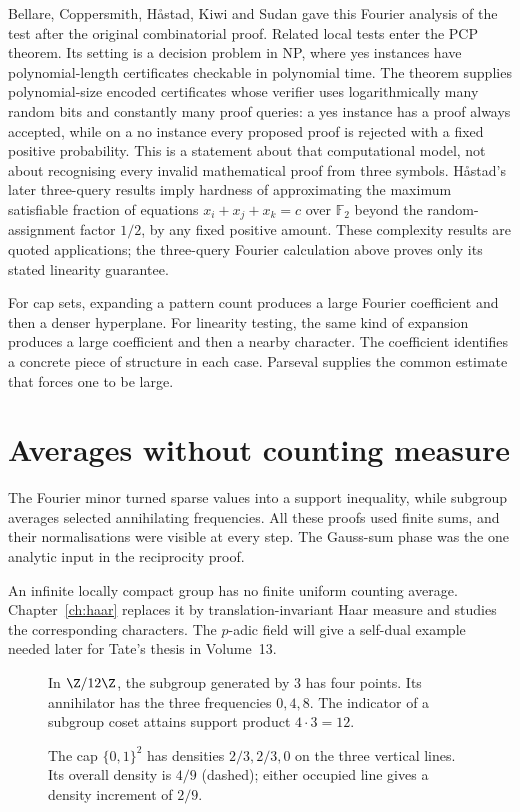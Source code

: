 Bellare, Coppersmith, H\aa stad, Kiwi and Sudan gave this Fourier analysis of the test after the original combinatorial proof. Related local tests enter the PCP theorem. Its setting is a decision problem in NP, where yes instances have polynomial-length certificates checkable in polynomial time. The theorem supplies polynomial-size encoded certificates whose verifier uses logarithmically many random bits and constantly many proof queries: a yes instance has a proof always accepted, while on a no instance every proposed proof is rejected with a fixed positive probability. This is a statement about that computational model, not about recognising every invalid mathematical proof from three symbols.
H\aa stad's later three-query results imply hardness of approximating the maximum satisfiable fraction of equations $x_i+x_j+x_k=c$ over $\mathbb F_2$ beyond the random-assignment factor $1/2$, by any fixed positive amount. These complexity results are quoted applications; the three-query Fourier calculation above proves only its stated linearity guarantee.

\begin{beauty}
For cap sets, expanding a pattern count produces a large Fourier coefficient and then a denser hyperplane. For linearity testing, the same kind of expansion produces a large coefficient and then a nearby character. The coefficient identifies a concrete piece of structure in each case. Parseval supplies the common estimate that forces one to be large.
\end{beauty}

\section{Averages without counting measure}

The Fourier minor turned sparse values into a support inequality, while subgroup averages selected annihilating frequencies. All these proofs used finite sums, and their normalisations were visible at every step. The Gauss-sum phase was the one analytic input in the reciprocity proof.

An infinite locally compact group has no finite uniform counting average. Chapter~\ref{ch:haar} replaces it by translation-invariant Haar measure and studies the corresponding characters. The $p$-adic field will give a self-dual example needed later for Tate's thesis in Volume~13.

\begin{figure}[ht]
\centering{}
\caption{In $\Z/12\Z$, the subgroup generated by $3$ has four points. Its annihilator has the three frequencies $0,4,8$. The indicator of a subgroup coset attains support product $4\cdot3=12$.}
\label{fig:v8c12annihilator}
\end{figure}
\begin{figure}[ht]
\centering{}
\caption{The cap $\{0,1\}^2$ has densities $2/3,2/3,0$ on the three vertical lines. Its overall density is $4/9$ (dashed); either occupied line gives a density increment of $2/9$.}
\label{fig:v8c12increment}
\end{figure}

